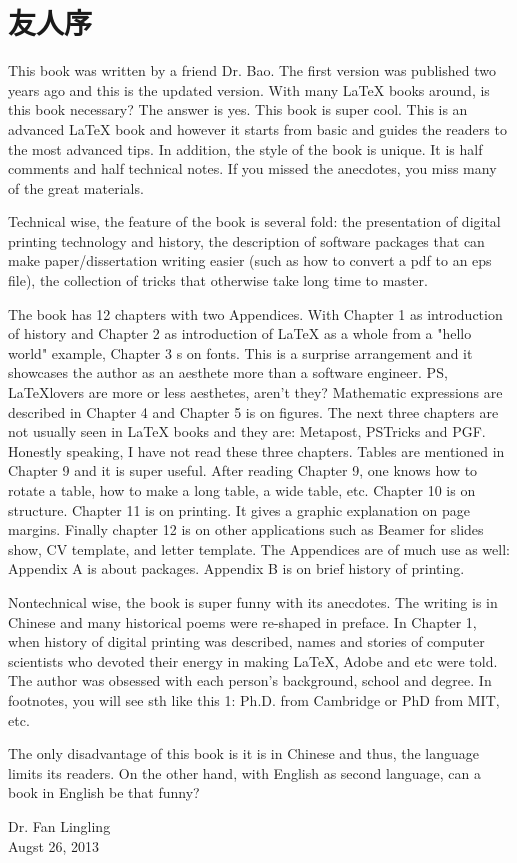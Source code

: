 \chapter{友人序}

This book was written by a friend Dr. Bao. The first version was published two years ago and this is the updated version. With many \LaTeX{} books around, is this book necessary? The answer is yes. This book is super cool. This is an advanced \LaTeX{} book and however it starts from basic and guides the readers to the most advanced tips. In addition, the style of the book is unique. It is half comments and half technical notes. If you missed the anecdotes, you miss many of the great materials.

Technical wise, the feature of the book is several fold: the presentation of digital printing technology and history, the description of software packages that can make paper/dissertation writing easier (such as how to convert a pdf to an eps file), the collection of tricks that otherwise take long time to master.

The book has 12 chapters with two Appendices. With Chapter 1 as introduction of history and Chapter 2 as introduction of \LaTeX{} as a whole from a "hello world" example, Chapter 3 s on fonts. This is a surprise arrangement and it showcases the author as an aesthete more than a software engineer. PS, \LaTeX lovers are more or less aesthetes, aren't they? Mathematic expressions are described in Chapter 4 and Chapter 5 is on figures. The next three chapters are not usually seen in \LaTeX{} books and they are: Metapost, PSTricks and PGF. Honestly speaking, I have not read these three chapters. Tables are mentioned in Chapter 9 and it is super useful. After reading Chapter 9, one knows how to rotate a table, how to make a long table, a wide table, etc. Chapter 10 is on structure. Chapter 11 is on printing. It gives a graphic explanation on page margins. Finally chapter 12 is on other applications such as Beamer for slides show, CV template, and letter template. The Appendices are of much use as well: Appendix A is about packages. Appendix B is on brief history of printing. 

Nontechnical wise, the book is super funny with its anecdotes. The writing is in Chinese and many historical poems were re-shaped in preface. In Chapter 1, when history of digital printing was described, names and stories of computer scientists who devoted their energy in making \LaTeX, Adobe and etc were told. The author was obsessed with each person's background, school and degree. In footnotes, you will see sth like this 1: Ph.D. from Cambridge or PhD from MIT, etc.

The only disadvantage of this book is it is in Chinese and thus, the language limits its readers. On the other hand, with English as second language, can a book in English be that funny?

\begin{flushright}
Dr. Fan Lingling \\
Augst 26, 2013
\end{flushright}
